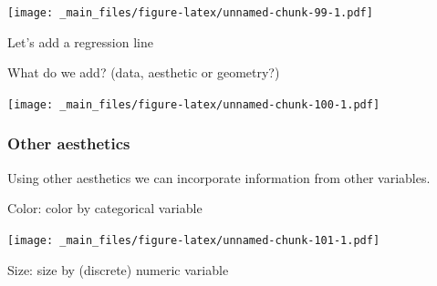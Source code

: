 \documentclass[]{article}
\newenvironment{Shaded}{\begin{snugshade}}{\end{snugshade}}
\newcommand{\KeywordTok}[1]{\textcolor[rgb]{0.13,0.29,0.53}{\textbf{{#1}}}}
\newcommand{\DataTypeTok}[1]{\textcolor[rgb]{0.13,0.29,0.53}{{#1}}}
\newcommand{\StringTok}[1]{\textcolor[rgb]{0.31,0.60,0.02}{{#1}}}
\newcommand{\NormalTok}[1]{{#1}}
\theoremstyle{definition}
\theoremstyle{definition}
\theoremstyle{remark}
\begin{document}
\texttt{[image: \_main\_files/figure-latex/unnamed-chunk-99-1.pdf]}

Let's add a regression line

What do we add? (data, aesthetic or geometry?)

\begin{Shaded}
\end{Shaded}

\texttt{[image: \_main\_files/figure-latex/unnamed-chunk-100-1.pdf]}

\subsubsection{Other aesthetics}\label{other-aesthetics}

Using other aesthetics we can incorporate information from other
variables.

Color: color by categorical variable

\begin{Shaded}
\end{Shaded}

\texttt{[image: \_main\_files/figure-latex/unnamed-chunk-101-1.pdf]}

Size: size by (discrete) numeric variable

\begin{Shaded}
\end{Shaded}
\end{document}
